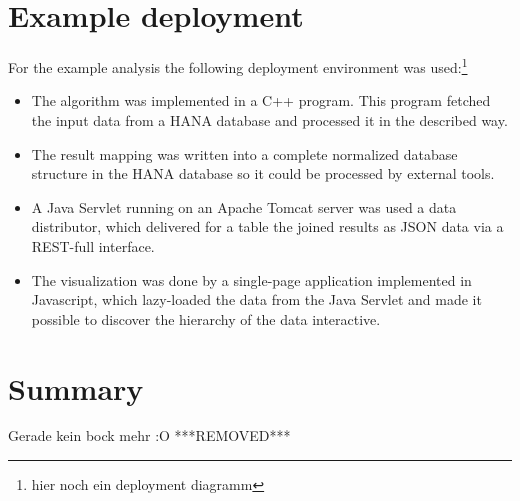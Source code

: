 \documentclass[10pt, journal, twocolumn]{IEEEtran}
\begin{document}
\section{Example deployment}
For the example analysis the following deployment environment was used:\footnote{hier noch ein deployment diagramm}
\begin{itemize}
\item The algorithm was implemented in a C++ program. This program fetched the input data from a HANA database and processed it in the described way.
\item The result mapping was written into a complete normalized database structure in the HANA database so it could be processed by external tools.
\item A Java Servlet running on an Apache Tomcat server was used a data distributor, which delivered for a table the joined results as JSON data via a REST-full interface.
\item The visualization was done by a single-page application implemented in Javascript, which lazy-loaded the data from the Java Servlet and made it possible to discover the hierarchy of the data interactive.
\end{itemize}
\section{Summary}
Gerade kein bock mehr :O
***REMOVED***
\end{document}
